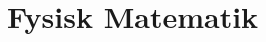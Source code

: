 \documentclass[crop=false, class=memoir]{standalone}
\begin{document}
\section{Fysisk Matematik}
\end{document}
